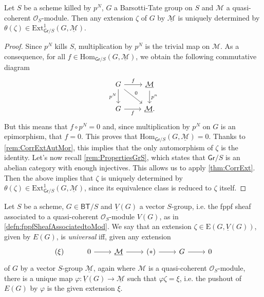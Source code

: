 \begin{lem}\label{lem:rigidityExt}
	Let $S$ be a scheme killed by $p^N$, $G$ a Barsotti-Tate group on $S$
	and $\mathcal{M}$ a quasi-coherent $\mathcal{O}_S$-module.
	Then any extension $\zeta$ of $G$ by $\underline{\mathcal{M}}$ is
	uniquely determined by $\theta(\zeta) \in 
	\mathrm{Ext}^1_{\mathsf{Gr}/S}(G, \underline{\mathcal{M}})$.
\end{lem} 
\begin{proof}
	Since $p^N$ kills $S$, multiplication by $p^N$ 
	is the trivial map on $\mathcal{M}$.
	As a consequence, for all $f \in \mathrm{Hom}_{\mathsf{Gr}/S}
	\left( G, \underline{\mathcal{M}} \right)$,
	we obtain the following commutative diagram
	\begin{equation*}
	\begin{tikzcd}
		G \arrow[r, "f", rightarrow] 
		\arrow[d, "p^N"', rightarrow] 
		\arrow[rd, "0", rightarrow] &
		\underline{\mathcal{M}} \arrow[d, "p^n", rightarrow] \\
		G \arrow[r, "f"', rightarrow] &
		\underline{\mathcal{M}}
	.\end{tikzcd}
	\end{equation*}
	But this means that $f \circ p^N = 0$ and, since multiplication
	by $p^N$ on $G$ is an epimorphism, that $f = 0$.
	This proves that $\mathrm{Hom}_{ \mathsf{Gr}/S } \left( G, \underline{\mathcal{M}} \right) = 0$.
	Thanks to \cref{rem:CorrExtAutMor}, this implies that
	the only automorphism of $\zeta$ is the identity.
	Let's now recall \cref{rem:PropertiesGrS},
	which states that $\mathsf{Gr}/S$ is an abelian category with enough injectives.
	This allows us to apply \cref{thm:CorrExt}.
	Then the above implies that $\zeta$ is uniquely determined by $\theta(\zeta)
	\in \mathrm{Ext}^1_{\mathsf{Gr}/S}(G, \underline{\mathcal{M}})$,
	since its equivalence class is reduced to $\zeta$ itself.
\end{proof}


\begin{defn}
	Let $S$ be a scheme, $G \in \mathsf{BT}/S$
	and $\underline{V}(G)$ a vector $S$-group,
	i.e. the fppf sheaf associated to a quasi-coherent
	$\mathcal{O}_{ S }$-module $V(G)$, as in \cref{defn:fppfSheafAssociatedtoMod}.
	We say that an extension $\zeta \in \mathrm{E}(G, \underline{V}(G))$, given
	by $E(G)$, is {\em universal} iff, given any extension
	\begin{equation*}
	\begin{tikzcd}
		(\xi) &
		0 \arrow[r, "", rightarrow] &
		\underline{\mathcal{M}} \arrow[r, "", rightarrow] &
		(*) \arrow[r, "", rightarrow] &
		G \arrow[r, "", rightarrow] &
		0
	\end{tikzcd}
	\end{equation*}
	of $G$ by a vector $S$-group $\underline{\mathcal{M}}$, again
	where $\mathcal{M}$ is a quasi-coherent $\mathcal{O}_{ S }$-module,
	there is a unique map $\varphi\colon \underline{V}(G) \to \underline{\mathcal{M}}$
	such that $\varphi\zeta = \xi$, i.e. the pushout of
	$E(G)$ by $\varphi$ is the given extension $\xi$.
\end{defn}


